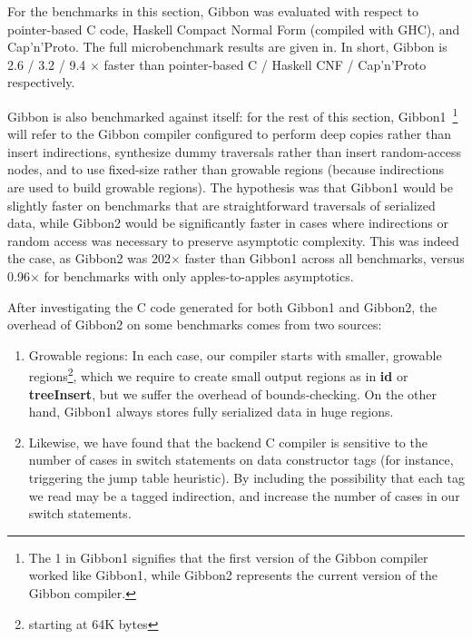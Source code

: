 For the benchmarks in this section, Gibbon was evaluated with respect to
pointer-based C code, Haskell Compact Normal Form (compiled with GHC),
and Cap'n'Proto.
%
The full microbenchmark results are given in. In short,
Gibbon is 2.6 / 3.2 / 9.4 $\times$ faster than pointer-based C / Haskell CNF /
Cap'n'Proto respectively.

Gibbon is also benchmarked against itself: for the rest of this section,
Gibbon1~\footnote{The 1 in Gibbon1 signifies that the first version of the
Gibbon compiler worked like Gibbon1, while Gibbon2 represents the current
version of the Gibbon compiler.} will refer to the Gibbon compiler configured to
perform deep copies rather than insert indirections, synthesize dummy traversals
rather than insert random-access nodes, and to use fixed-size rather than
growable regions (because indirections are used to build growable regions). The
hypothesis was that Gibbon1 would be slightly faster on benchmarks that are
straightforward traversals of serialized data, while Gibbon2 would be
significantly faster in cases where indirections or random access was necessary
to preserve asymptotic complexity. This was indeed the case, as Gibbon2 was
202$\times$ faster than Gibbon1 across all benchmarks, versus 0.96$\times$ for
benchmarks with only apples-to-apples asymptotics.





After investigating the C code generated for both Gibbon1 and Gibbon2,
the overhead of Gibbon2 on some benchmarks comes from two sources:
%
\begin{enumerate}
\item Growable regions: In each case, our compiler starts with smaller, growable
regions\footnote{starting at 64K bytes}, which we require to create small output
regions as in {\bf id} or {\bf treeInsert}, but we suffer the overhead of
bounds-checking. On the other hand, Gibbon1 always stores fully serialized data
in huge regions.

\item Likewise, we have found that the backend C compiler is sensitive to the
number of cases in switch statements on data constructor tags (for instance,
triggering the jump table heuristic). By including the possibility that each tag
we read may be a tagged indirection, %
and increase the number of cases in our switch statements.
\end{enumerate}


